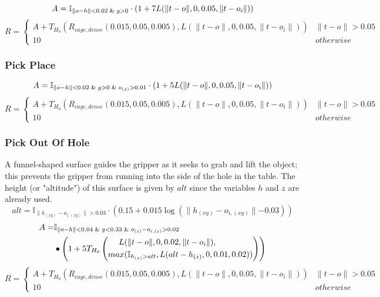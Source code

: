 {\[
A=\mathbb{I}_{\lVert o - h \rVert < 0.02 \And g > 0} \cdot
    (1 + 7L(\lVert t - o \rVert, 0, 0.05, \lVert t - o_i \rVert))
\]
\[
R=\left\{
    \begin{array}{ll}
        A + 
        T_{H_0}\left(
            R_{cage,dense}(0.015,0.05,0.005),
            L(\lVert t - o \rVert, 0, 0.05, \lVert t - o_i \rVert)
        \right)
            & \lVert t - o \rVert > 0.05 \\
        10
            & otherwise
    \end{array}
\right.
\]

\subsubsection{Pick Place}

\[
A=\mathbb{I}_{\lVert o - h \rVert < 0.02 \And g > 0 \And o_{(z)} > 0.01} \cdot
    (1 + 5L(\lVert t - o \rVert, 0, 0.05, \lVert t - o_i \rVert))
\]
\[
R=\left\{
    \begin{array}{ll}
        A + 
        T_{H_0}\left(
            R_{cage,dense}(0.015,0.05,0.005),
            L(\lVert t - o \rVert, 0, 0.05, \lVert t - o_i \rVert)
        \right)
            & \lVert t - o \rVert > 0.05 \\
        10
            & otherwise
    \end{array}
\right.
\]

\subsubsection{Pick Out Of Hole}
A funnel-shaped surface guides the gripper as it seeks to grab and lift the object; this prevents the gripper from running into the side of the hole in the table. The height (or "altitude") of this surface is given by $alt$ since the variables $h$ and $z$ are already used.
\[
alt = \mathbb{I}_{\lVert h_{(xy)} - o_{i,(xy)} \lVert > 0.03} \cdot
    \left(0.15 + 0.015\log\left(\lVert h_{(xy)} - o_{i,(xy)} \lVert - 0.03\right)\right)
\]
\[
\begin{aligned}
A=&\mathbb{I}_{\lVert o - h \rVert < 0.04 \And g < 0.33 \And o_{(z)} - o_{i,(z)} > 0.02} \\ 
& \bullet
    \left(1 + 5T_{H_0}\left(
        \begin{aligned}
        L(&\lVert t - o \rVert, 0, 0.02, \lVert t - o_i \rVert), \\
         max(&\mathbb{I}_{h_{(z)} > alt}, L(alt - h_{(z)}, 0, 0.01, 0.02))\\
        \end{aligned}
    \right)\right)
\end{aligned}
\]
\[
R=\left\{
    \begin{array}{ll}
        A + 
        T_{H_0}\left(
            R_{cage,dense}(0.015,0.05,0.005),
            L(\lVert t - o \rVert, 0, 0.05, \lVert t - o_i \rVert)
        \right)
            & \lVert t - o \rVert > 0.05 \\
        10
            & otherwise
    \end{array}
\right.
\]

}
